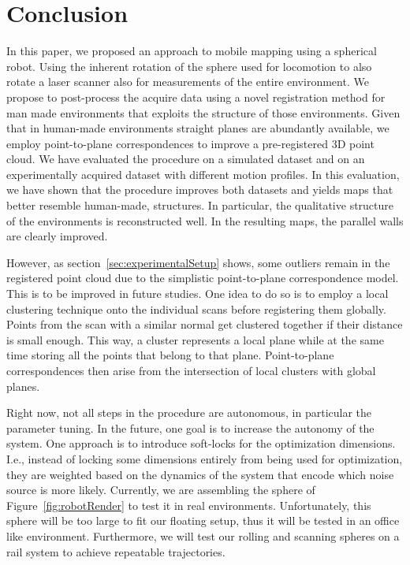 \section{Conclusion}

In this paper, we proposed an approach to mobile mapping using a spherical robot. 
Using the inherent rotation of the sphere used for locomotion to also rotate a laser scanner also for measurements of the entire environment.
We propose to post-process the acquire data using a novel registration method for man made environments that exploits the structure of those environments. 
Given that in human-made environments straight planes are abundantly available, we employ point-to-plane correspondences to improve a pre-registered 3D point cloud. 
We have evaluated the procedure on a simulated dataset and on an experimentally acquired dataset with different motion profiles. 
In this evaluation, we have shown that the procedure improves both datasets and yields maps that better resemble human-made, structures. 
In particular, the qualitative structure of the environments is reconstructed well. 
In the resulting maps, the parallel walls are clearly improved.

However, as section~\ref{sec:experimentalSetup} shows, some outliers remain in the registered point cloud due to the simplistic point-to-plane correspondence model.
This is to be improved in future studies.
One idea to do so is to employ a local clustering technique onto the individual scans before registering them globally. 
Points from the scan with a similar normal get clustered together if their distance is small enough.
This way, a cluster represents a local plane while at the same time storing all the points that belong to that plane.
Point-to-plane correspondences then arise from the intersection of local clusters with global planes.

%
Right now, not all steps in the procedure are autonomous, in particular the parameter tuning. 
In the future, one goal is to increase the autonomy of the system.
One approach is to introduce soft-locks for the optimization dimensions.
I.e., instead of locking some dimensions entirely from being used for optimization, they are weighted based on the dynamics of the system that encode which noise source is more likely.  
%
Currently, we are assembling the sphere of Figure~\ref{fig:robotRender} to test it in real environments.
Unfortunately, this sphere will be too large to fit our floating setup, thus it will be tested in an office like environment.
Furthermore, we will test our rolling and scanning spheres on a rail system to achieve repeatable trajectories. 
